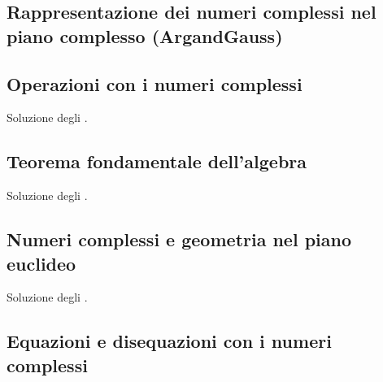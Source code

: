 \documentclass[letterpaper,10pt,italian]{jupyterBook}
\begin{document}
\subsection{Rappresentazione dei numeri complessi nel piano complesso (Argand\sphinxhyphen{}Gauss)}
\label{\detokenize{ch/algebra/complex-algebra-sol:rappresentazione-dei-numeri-complessi-nel-piano-complesso-argand-gauss}}\label{\detokenize{ch/algebra/complex-algebra-sol:math-hs-algebra-complex-sol-complex-plane-sol}}

\subsection{Operazioni con i numeri complessi}
\label{\detokenize{ch/algebra/complex-algebra-sol:operazioni-con-i-numeri-complessi}}\label{\detokenize{ch/algebra/complex-algebra-sol:math-hs-algebra-complex-sol-operations-sol}}
\sphinxAtStartPar
Soluzione degli {\hyperref[\detokenize{ch/algebra/complex-algebra-problems:math-hs-algebra-complex-problems-operations-cc-re-im}]{}}.


\subsection{Teorema fondamentale dell’algebra}
\label{\detokenize{ch/algebra/complex-algebra-sol:teorema-fondamentale-dell-algebra}}\label{\detokenize{ch/algebra/complex-algebra-sol:math-hs-algebra-complex-sol-fund-thm-sol}}
\sphinxAtStartPar
Soluzione degli {\hyperref[\detokenize{ch/algebra/complex-algebra-problems:math-hs-algebra-complex-problems-fund-thm}]{}}.


\subsection{Numeri complessi e geometria nel piano euclideo}
\label{\detokenize{ch/algebra/complex-algebra-sol:numeri-complessi-e-geometria-nel-piano-euclideo}}\label{\detokenize{ch/algebra/complex-algebra-sol:math-hs-algebra-complex-sol-geometry-2d-sol}}
\sphinxAtStartPar
Soluzione degli {\hyperref[\detokenize{ch/algebra/complex-algebra-problems:math-hs:algebra:complex:problems:geometry-2d:ex}]{}}.


\subsection{Equazioni e disequazioni con i numeri complessi}
\label{\detokenize{ch/algebra/complex-algebra-sol:equazioni-e-disequazioni-con-i-numeri-complessi}}\label{\detokenize{ch/algebra/complex-algebra-sol:math-hs-algebra-complex-sol-equations-sol}}
\end{document}
